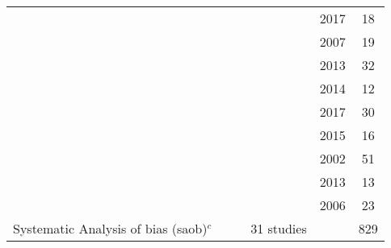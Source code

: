 \begin{tabular}{ cccccc }
 & & & \citeauthor{Lee2017} & 2017 & 18 \\
 & & & \citeauthor{Leins2007} & 2007 & 19 \\
 & & & \citeauthor{Li2013} & 2013 & 32 \\
 & & & \citeauthor{Meisel2014} & 2014 & 12 \\
 & & & \citeauthor{Mohagheghi2017} & 2017 & 30 \\
 & & & \citeauthor{Mohammadi2015} & 2015 & 16 \\
 & & & \citeauthor{Monastra2002} & 2002 & 51 \\
 & & & \citeauthor{Ogrim2013} & 2013 & 13 \\
 & & & \citeauthor{Strehl2006} & 2006 & 23 \\
 \shortstack{Systematic Analysis \\ of bias (\gls{saob})$^c$} & & & 31 studies & & 829 \\
\bottomrule
\end{tabular}
